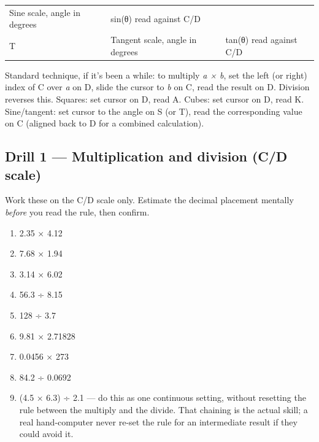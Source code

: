 \documentclass[
  10pt,
]{article}
\providecommand{\tightlist}{%
  \setlength{\itemsep}{0pt}\setlength{\parskip}{0pt}}
\begin{document}
\begin{longtable}[]{@{}lll@{}}
\begin{minipage}[t]{0.44\columnwidth}
Sine scale, angle in degrees\strut
\end{minipage} & \begin{minipage}[t]{0.20\columnwidth}\raggedright
sin(θ) read against C/D\strut
\end{minipage}\tabularnewline
\begin{minipage}[t]{0.28\columnwidth}\raggedright
T\strut
\end{minipage} & \begin{minipage}[t]{0.44\columnwidth}\raggedright
Tangent scale, angle in degrees\strut
\end{minipage} & \begin{minipage}[t]{0.20\columnwidth}\raggedright
tan(θ) read against C/D\strut
\end{minipage}\tabularnewline
\bottomrule
\end{longtable}

Standard technique, if it's been a while: to multiply \emph{a × b}, set
the left (or right) index of C over \emph{a} on D, slide the cursor to
\emph{b} on C, read the result on D. Division reverses this. Squares:
set cursor on D, read A. Cubes: set cursor on D, read K. Sine/tangent:
set cursor to the angle on S (or T), read the corresponding value on C
(aligned back to D for a combined calculation).

\hypertarget{drill-1-multiplication-and-division-cd-scale}{%
\subsection{Drill 1 --- Multiplication and division (C/D
scale)}\label{drill-1-multiplication-and-division-cd-scale}}

Work these on the C/D scale only. Estimate the decimal placement
mentally \emph{before} you read the rule, then confirm.

\begin{enumerate}
\def\labelenumi{\arabic{enumi}.}
\tightlist
\item
  2.35 × 4.12
\item
  7.68 × 1.94
\item
  3.14 × 6.02
\item
  56.3 ÷ 8.15
\item
  128 ÷ 3.7
\item
  9.81 × 2.71828
\item
  0.0456 × 273
\item
  84.2 ÷ 0.0692
\item
  (4.5 × 6.3) ÷ 2.1 --- do this as one continuous setting, without
  resetting the rule between the multiply and the divide. That chaining
  is the actual skill; a real hand-computer never re-set the rule for an
  intermediate result if they could avoid it.
\end{enumerate}
\end{document}
